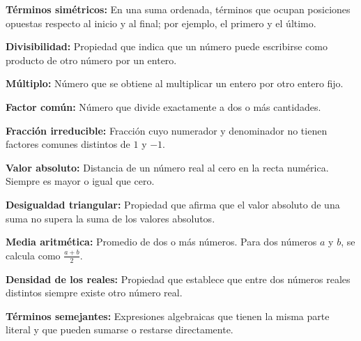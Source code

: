 \documentclass[12pt,final]{report}
\theoremstyle{plain}
\theoremstyle{definition}
\begin{document}
\vspace{0.5em}

\textbf{Términos simétricos:} En una suma ordenada, términos que ocupan posiciones opuestas respecto al inicio y al final; por ejemplo, el primero y el último.

\vspace{0.5em}

\textbf{Divisibilidad:} Propiedad que indica que un número puede escribirse como producto de otro número por un entero.

\vspace{0.5em}

\textbf{Múltiplo:} Número que se obtiene al multiplicar un entero por otro entero fijo.

\vspace{0.5em}

\textbf{Factor común:} Número que divide exactamente a dos o más cantidades.

\vspace{0.5em}

\textbf{Fracción irreducible:} Fracción cuyo numerador y denominador no tienen factores comunes distintos de $1$ y $-1$.

\vspace{0.5em}

\textbf{Valor absoluto:} Distancia de un número real al cero en la recta numérica. Siempre es mayor o igual que cero.

\vspace{0.5em}

\textbf{Desigualdad triangular:} Propiedad que afirma que el valor absoluto de una suma no supera la suma de los valores absolutos.

\vspace{0.5em}

\textbf{Media aritmética:} Promedio de dos o más números. Para dos números $a$ y $b$, se calcula como $\frac{a+b}{2}$.

\vspace{0.5em}

\textbf{Densidad de los reales:} Propiedad que establece que entre dos números reales distintos siempre existe otro número real.

\vspace{0.5em}

\textbf{Términos semejantes:} Expresiones algebraicas que tienen la misma parte literal y que pueden sumarse o restarse directamente.

\vspace{0.5em}
\end{document}
